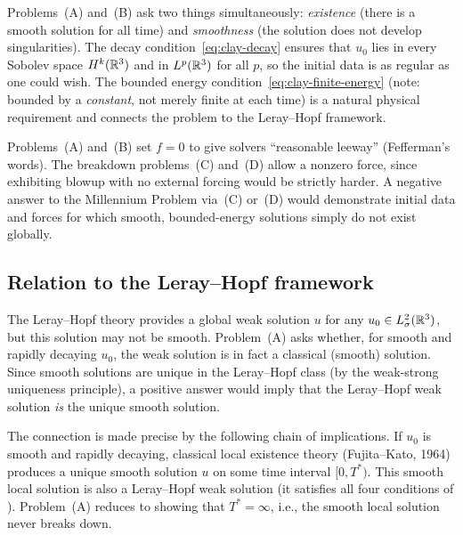 \begin{remark}
  Problems~(A) and~(B) ask two things simultaneously: \emph{existence} (there is a smooth
  solution for all time) and \emph{smoothness} (the solution does not develop
  singularities).  The decay condition~\eqref{eq:clay-decay} ensures that $u_{0}$ lies in
  every Sobolev space $H^{k}(\mathbb{R}^{3})$ and in $L^{p}(\mathbb{R}^{3})$ for all $p$, so the
  initial data is as regular as one could wish.  The bounded energy
  condition~\eqref{eq:clay-finite-energy} (note: bounded by a \emph{constant}, not merely
  finite at each time) is a natural physical requirement and connects the problem to the
  Leray--Hopf framework.

  Problems~(A) and~(B) set $f = 0$ to give solvers ``reasonable leeway''
  (Fefferman's words).  The breakdown problems~(C) and~(D) allow a nonzero force, since
  exhibiting blowup with no external forcing would be strictly harder.  A negative answer
  to the Millennium Problem via~(C) or~(D) would demonstrate initial data and forces for
  which smooth, bounded-energy solutions simply do not exist globally.
\end{remark}

\subsection{Relation to the Leray--Hopf framework}

\begin{remark}\label{rem:leray-hopf-to-clay}
  The Leray--Hopf theory provides a global weak solution $u$ for any $u_{0} \in
  L^{2}_\sigma(\mathbb{R}^{3})$, but this solution may not be smooth.  Problem~(A) asks whether,
  for smooth and rapidly decaying $u_{0}$, the weak solution is in fact a classical
  (smooth) solution.  Since smooth solutions are unique in the Leray--Hopf class (by the
  weak-strong uniqueness principle), a positive answer would imply that the Leray--Hopf
  weak solution \emph{is} the unique smooth solution.

  The connection is made precise by the following chain of implications.  If $u_{0}$ is
  smooth and rapidly decaying, classical local existence theory (Fujita--Kato, 1964)
  produces a unique smooth solution $u$ on some time interval $[0, T^{*})$.  This smooth
  local solution is also a Leray--Hopf weak solution (it satisfies all four conditions of
  ).  Problem~(A) reduces to showing that $T^{*} = \infty$,
  i.e., the smooth local solution never breaks down.
\end{remark}

